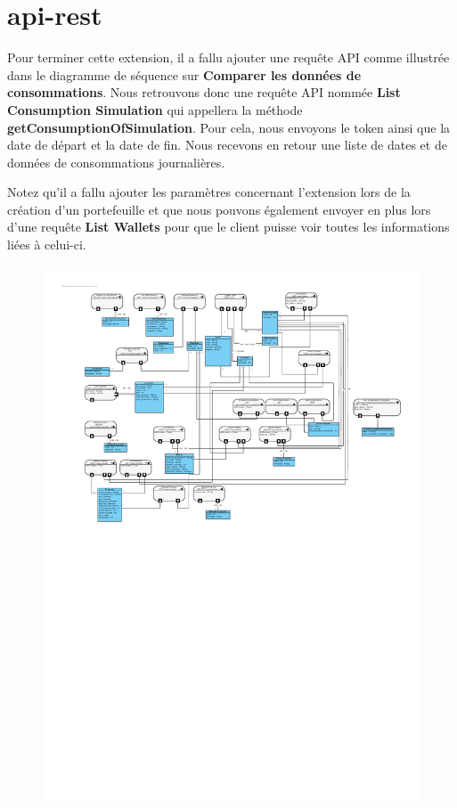 \section{api-rest}

\begin{flushleft}
Pour terminer cette extension, il a fallu ajouter une requête API comme illustrée dans le diagramme de séquence sur \textbf{Comparer les données de consommations}. Nous retrouvons donc une requête API nommée \textbf{List Consumption Simulation} qui appellera la méthode \textbf{getConsumptionOfSimulation}. Pour cela, nous envoyons le token ainsi que la date de départ et la date de fin. Nous recevons en retour une liste de dates et de données de consommations journalières.
\end{flushleft}

\begin{flushleft}
Notez qu'il a fallu ajouter les paramètres concernant l'extension lors de la création d'un portefeuille et que nous pouvons également envoyer en plus lors d'une requête \textbf{List Wallets} pour que le client puisse voir toutes les informations liées à celui-ci.
\end{flushleft}

\begin{figure}[h]
\centering
\includegraphics[width=1.3\textwidth]{extension-adrien/Api-rest/img/apirest.pdf}
\end{figure}
